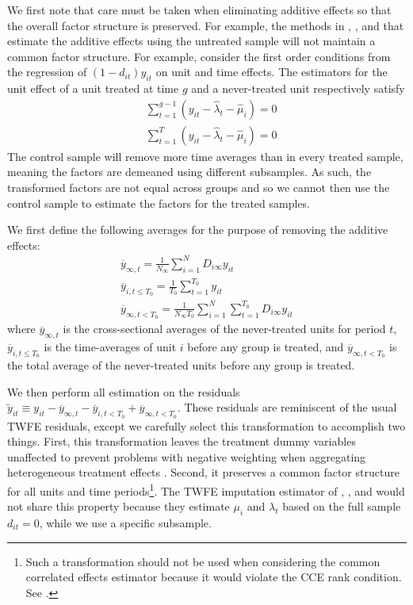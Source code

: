 \documentclass[12pt]{article}
\begin{document}
We first note that care must be taken when eliminating additive effects so that the overall factor structure is preserved. For example, the methods in \citet{Borusyak_Jaravel_Spiess_2021}, \citet{Gardner_2021}, and \cite{Wooldridge_2021} that estimate the additive effects using the untreated sample will not maintain a common factor structure. For example, consider the first order conditions from the regression of $(1 - d_{it})y_{it}$ on unit and time effects. The estimators for the unit effect of a unit treated at time $g$ and a never-treated unit respectively satisfy
\begin{align}
  &\sum_{t = 1}^{g-1} (y_{it} - \widehat{\lambda}_t - \widehat{\mu}_i) = 0\\
  &\sum_{t = 1}^T (y_{it} - \widehat{\lambda}_t - \widehat{\mu}_i) = 0
\end{align}
The control sample will remove more time averages than in every treated sample, meaning the factors are demeaned using different subsamples. As such, the transformed factors are not equal across groups and so we cannot then use the control sample to estimate the factors for the treated samples. 

We first define the following averages for the purpose of removing the additive effects:
\begin{gather}
  \overline{y}_{\infty , t} = \frac{1}{N_{\infty}} \sum_{i = 1}^N D_{i \infty} y_{it} \\
  \overline{y}_{i,t\leq T_0} = \frac{1}{T_0} \sum_{t = 1}^{T_0} y_{it} \\
  \overline{y}_{\infty, t < T_0} = \frac{1}{N_{\infty} T_0} \sum_{i = 1}^N \sum_{t = 1}^{T_0} D_{i \infty} y_{it}
\end{gather}
where $\overline{y}_{\infty , t}$ is the cross-sectional averages of the never-treated units for period $t$, $\overline{y}_{i,t\leq T_0}$ is the time-averages of unit $i$ before any group is treated, and $\overline{y}_{\infty, t < T_0}$ is the total average of the never-treated units before any group is treated.

We then perform all estimation on the residuals $\tilde{y}_{it} \equiv y_{it} - \overline{y}_{\infty, t} - \overline{y}_{i,t < T_0} + \overline{y}_{\infty, t < T_0}$. These residuals are reminiscent of the usual TWFE residuals, except we carefully select this transformation to accomplish two things. First, this transformation leaves the treatment dummy variables unaffected to prevent problems with negative weighting when aggregating heterogeneous treatment effects \citep{Goodman-Bacon_2021,Borusyak_Jaravel_Spiess_2021}. Second, it preserves a common factor structure for all units and time periods\footnote{Such a transformation should not be used when considering the common correlated effects estimator because it would violate the CCE rank condition. See \citet{Brown_Butts_Westerlund_2023}.}. The TWFE imputation estimator of \citet{Gardner_2021}, \citet{Wooldridge_2021}, and \citet{Borusyak_Jaravel_Spiess_2021} would not share this property because they estimate $\mu_i$ and $\lambda_t$ based on the full sample $d_{it} = 0$, while we use a specific subsample.
\end{document}
